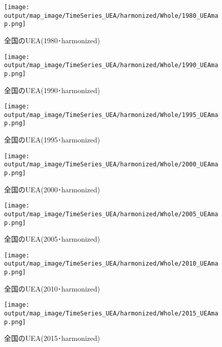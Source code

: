 \documentclass{ltjsarticle}
\begin{document}
\begin{figure}[pbth]
  \centering
  \texttt{[image: output/map\_image/TimeSeries\_UEA/harmonized/Whole/1980\_UEAmap.png]}
  \caption{\label{ham:1980UEA:who}全国のUEA(1980･harmonized)}
\end{figure}
\begin{figure}[pbth]
  \centering
  \texttt{[image: output/map\_image/TimeSeries\_UEA/harmonized/Whole/1990\_UEAmap.png]}
  \caption{\label{ham:1990UEA:who}全国のUEA(1990･harmonized)}
\end{figure}
\begin{figure}[pbth]
  \centering
  \texttt{[image: output/map\_image/TimeSeries\_UEA/harmonized/Whole/1995\_UEAmap.png]}
  \caption{\label{ham:1995UEA:who}全国のUEA(1995･harmonized)}
\end{figure}
\begin{figure}[pbth]
  \centering
  \texttt{[image: output/map\_image/TimeSeries\_UEA/harmonized/Whole/2000\_UEAmap.png]}
  \caption{\label{ham:2000UEA:who}全国のUEA(2000･harmonized)}
\end{figure}
\begin{figure}[pbth]
  \centering
  \texttt{[image: output/map\_image/TimeSeries\_UEA/harmonized/Whole/2005\_UEAmap.png]}
  \caption{\label{ham:2005UEA:who}全国のUEA(2005･harmonized)}
\end{figure}
\begin{figure}[pbth]
  \centering
  \texttt{[image: output/map\_image/TimeSeries\_UEA/harmonized/Whole/2010\_UEAmap.png]}
  \caption{\label{ham:2010UEA:who}全国のUEA(2010･harmonized)}
\end{figure}
\begin{figure}[pbth]
  \centering
  \texttt{[image: output/map\_image/TimeSeries\_UEA/harmonized/Whole/2015\_UEAmap.png]}
  \caption{\label{ham:2015UEA:who}全国のUEA(2015･harmonized)}
\end{figure}
\end{document}
